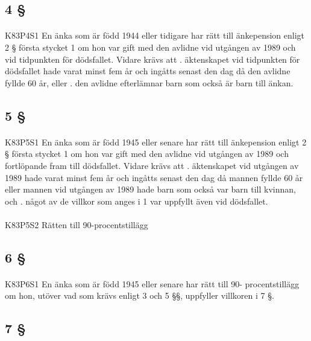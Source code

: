 \documentclass[a4paper,notitlepage,openany,10pt]{book}
\begin{document}
\subsection*{4 §}
\paragraph*{}
{\tiny K83P4S1}
En änka som är född 1944 eller tidigare har rätt till änkepension enligt 2 § första stycket 1 om hon var gift med den avlidne vid utgången av 1989 och vid tidpunkten för dödsfallet. Vidare krävs att
. äktenskapet vid tidpunkten för dödsfallet hade varat minst fem år och ingåtts senast den dag då den avlidne fyllde 60 år, eller
. den avlidne efterlämnar barn som också är barn till änkan.
\subsection*{5 §}
\paragraph*{}
{\tiny K83P5S1}
En änka som är född 1945 eller senare har rätt till änkepension enligt 2 § första stycket 1 om hon var gift med den avlidne vid utgången av 1989 och fortlöpande fram till dödsfallet. Vidare krävs att
. äktenskapet vid utgången av 1989 hade varat minst fem år och ingåtts senast den dag då mannen fyllde 60 år eller mannen vid utgången av 1989 hade barn som också var barn till kvinnan, och
. något av de villkor som anges i 1 var uppfyllt även vid dödsfallet.
\paragraph*{}
{\tiny K83P5S2}
Rätten till 90-procentstillägg
\subsection*{6 §}
\paragraph*{}
{\tiny K83P6S1}
En änka som är född 1945 eller senare har rätt till 90- procentstillägg om hon, utöver vad som krävs enligt 3 och 5 §§, uppfyller villkoren i 7 §.
\subsection*{7 §}
\end{document}
